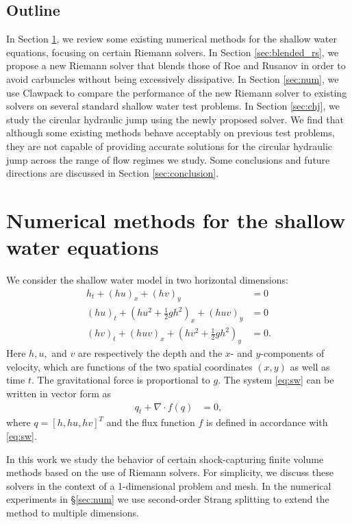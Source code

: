 \documentclass[preprint, 11pt]{article}
\begin{document}
\subsection{Outline}
In Section \ref{sec2}, we review some existing numerical methods for
the shallow water equations, focusing on certain Riemann solvers.
In Section \ref{sec:blended_rs}, we propose a new Riemann solver that blends
those of Roe and Rusanov in order to avoid carbuncles without being
excessively dissipative.  In Section \ref{sec:num}, we use Clawpack to
compare the performance of the new Riemann solver to existing
solvers on several standard shallow water test problems.  In Section \ref{sec:chj}, we
study the circular hydraulic jump using the newly proposed solver.
We find that although some
existing methods behave acceptably on previous test problems, they
are not capable of providing accurate solutions for the circular hydraulic jump
across the range of flow regimes we study.
Some conclusions and future directions are discussed in Section \ref{sec:conclusion}.


\section{Numerical methods for the shallow water equations} \label{sec2}
We consider the shallow water model in two horizontal dimensions:
\begin{subequations} \label{eq:sw}
\begin{align}
    h_t + (hu)_x + (hv)_y & = 0 \\
    (hu)_t + \left(hu^2 + \frac{1}{2}gh^2\right)_x + (huv)_y & = 0 \\
    (hv)_t + (huv)_x + \left(hv^2 + \frac{1}{2}gh^2\right)_y & = 0.
\end{align}
\end{subequations}
Here $h, u,$ and $v$ are respectively the depth and the $x$- and $y$-components of
velocity, which are functions of the two spatial coordinates $(x,y)$ as well as time $t$.
The gravitational force is proportional to $g$.
The system \eqref{eq:sw} can be written in vector form as
\begin{align}
    q_t + \nabla \cdot f(q) & = 0,
\end{align}
where $q=[h, hu, hv]^T$ and the flux function $f$ is defined in accordance
with \eqref{eq:sw}.

In this work we study the behavior of certain shock-capturing finite volume
methods based on the use of Riemann solvers.  For simplicity, we discuss these
solvers in the context of a 1-dimensional problem and mesh.  
In the numerical experiments in \S\ref{sec:num} we use second-order Strang
splitting \cite{strang1968construction} to extend the method to multiple dimensions.
\end{document}
